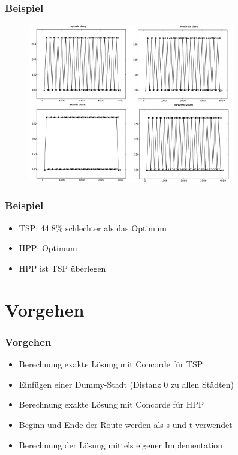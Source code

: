 \documentclass[12pt]{beamer}
\begin{document}
    \begin{frame}
    \frametitle{Beispiel}
        \begin{figure}[H]
	    \centering
	        \includegraphics[width=9cm]{gfx/zz_comparison}
        \end{figure}
    \end{frame}

    \begin{frame}
        \frametitle{Beispiel}
	    \begin{itemize}
                \item TSP: 44.8\% schlechter als das Optimum
                \item HPP: Optimum
                \item HPP ist TSP überlegen
            \end{itemize}
    \end{frame}

    \section{Vorgehen}
    \begin{frame}
        \frametitle{Vorgehen}
	    \begin{itemize}
                \item Berechnung exakte Lösung mit Concorde für TSP
                \item Einfügen einer Dummy-Stadt (Distanz 0 zu allen Städten)
                \item Berechnung exakte Lösung mit Concorde für HPP
                \item Beginn und Ende der Route werden als s und t verwendet
                \item Berechnung der Lösung mittels eigener Implementation
            \end{itemize}
    \end{frame}
\end{document}
